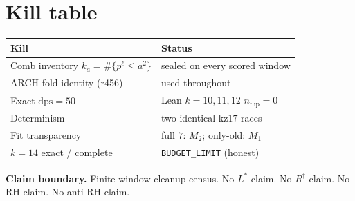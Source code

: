 \documentclass[11pt]{article}
\begin{document}
\section{Kill table}\label{sec:kills}

\begin{center}
\begin{tabular}{@{}lp{7.8cm}@{}}
\toprule
Kill & Status \\
\midrule
Comb inventory $k_a=\#\{p^{\ell}\le a^2\}$
  & sealed on every scored window \\
ARCH fold identity (r456)
  & used throughout \\
Exact $\mathrm{dps}=50$
  & Lean $k=10,11,12$ $n_{\mathrm{flip}}=0$ \\
Determinism
  & two identical kz$17$ races \\
Fit transparency
  & full $7$: $M_2$; only-old: $M_1$ \\
$k=14$ exact / complete
  & \texttt{BUDGET\_LIMIT} (honest) \\
\bottomrule
\end{tabular}
\end{center}

\medskip\noindent
\textbf{Claim boundary.}\enspace
Finite-window cleanup census.
No $L^{*}$ claim.
No $R^{\dagger}$ claim.
No RH claim.
No anti-RH claim.
\end{document}
